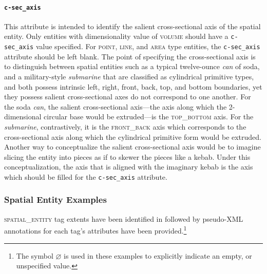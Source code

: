 \documentclass[11pt]{article}
\begin{document}
\paragraph{\texttt{c-sec\_axis}} %
\label{par:c_sec_axis}
This attribute is intended to identify the salient cross-sectional axis of the spatial entity. Only entities with dimensionality value of \textsc{volume} should have a \texttt{c-sec\_axis} value specified. For \textsc{point}, \textsc{line}, and \textsc{area} type entities, the \texttt{c-sec\_axis} attribute should be left blank. The point of specifying the cross-sectional axis is to distinguish between spatial entities such as a typical twelve-ounce \emph{can} of soda, and a military-style \emph{submarine} that are classified as cylindrical primitive types, and both possess intrinsic left, right, front, back, top, and bottom boundaries, yet they possess salient cross-sectional axes do not correspond to one another. For the soda \emph{can}, the salient cross-sectional axis---the axis along which the 2-dimensional circular base would be extruded---is the \textsc{top\_bottom} axis. For the \emph{submarine}, contrastively, it is the \textsc{front\_back} axis which corresponds to the cross-sectional axis along which the cylindrical primitive form would be extruded. Another way to conceptualize the salient cross-sectional axis would be to imagine slicing the entity into pieces as if to skewer the pieces like a kebab. Under this conceptualization, the axis that is aligned with the imaginary kebab is the axis which should be filled for the \texttt{c-sec\_axis} attribute.


\subsubsection{Spatial Entity Examples} %
\label{ssub:spatial_entity_examples}

\textsc{spatial\_entity} tag extents have been identified in  followed by pseudo-XML annotations for each tag's attributes have been provided.\footnote{The symbol $\varnothing$ is used in these examples to explicitly indicate an empty, or unspecified value.}
\end{document}
